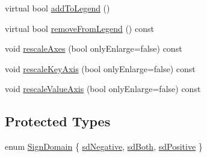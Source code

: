 \begin{DoxyCompactItemize}
\item 
virtual bool \hyperlink{classQCPAbstractPlottable_a70f8cabfd808f7d5204b9f18c45c13f5}{add\+To\+Legend} ()
\item 
virtual bool \hyperlink{classQCPAbstractPlottable_aa1f350e510326d012b9a9c9249736c83}{remove\+From\+Legend} () const 
\item 
void \hyperlink{classQCPAbstractPlottable_a7e8fc3be43c27ccacd70a7bf9d74a5cd}{rescale\+Axes} (bool only\+Enlarge=false) const 
\item 
void \hyperlink{classQCPAbstractPlottable_a1acecfcca3e7fcda00fcbaa3c886386f}{rescale\+Key\+Axis} (bool only\+Enlarge=false) const 
\item 
void \hyperlink{classQCPAbstractPlottable_abfd0805eb1d955c0111a990246658324}{rescale\+Value\+Axis} (bool only\+Enlarge=false) const 
\end{DoxyCompactItemize}
\subsection*{Protected Types}
\begin{DoxyCompactItemize}
\item 
enum \hyperlink{classQCPAbstractPlottable_a661743478a1d3c09d28ec2711d7653d8}{Sign\+Domain} \{ \hyperlink{classQCPAbstractPlottable_a661743478a1d3c09d28ec2711d7653d8a0fc9a70796ef60ad18ddd18056e6dc63}{sd\+Negative}, 
\hyperlink{classQCPAbstractPlottable_a661743478a1d3c09d28ec2711d7653d8a082b98cfb91a7363a3b5cd17b0c1cd60}{sd\+Both}, 
\hyperlink{classQCPAbstractPlottable_a661743478a1d3c09d28ec2711d7653d8a02951859f243a4d24e779cfbb5471030}{sd\+Positive}
 \}
\end{DoxyCompactItemize}
